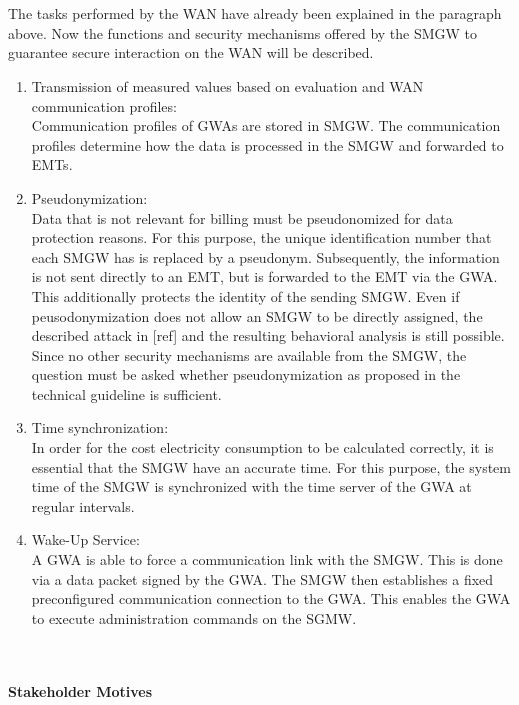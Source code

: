 \\
\\
The tasks performed by the WAN have already been explained in the paragraph above. Now the functions and security mechanisms offered by the SMGW to guarantee secure interaction on the WAN will be described.
\begin{enumerate}
\item Transmission of measured values based on evaluation and WAN communication profiles:\\
Communication profiles of GWAs are stored in SMGW. The communication profiles determine how the data is processed in the SMGW and forwarded to EMTs.

\item Pseudonymization:\\
Data that is not relevant for billing must be pseudonomized for data protection reasons. For this purpose, the unique identification number that each SMGW has is replaced by a pseudonym. Subsequently, the information is not sent directly to an EMT, but is forwarded to the EMT via the GWA. This additionally protects the identity of the sending SMGW.%
Even if peusodonymization does not allow an SMGW to be directly assigned, the described attack in [ref] and the resulting behavioral analysis is still possible. Since no other security mechanisms are available from the SMGW, the question must be asked whether pseudonymization as proposed in the technical guideline is sufficient.

\item Time synchronization:\\
In order for the cost electricity consumption to be calculated correctly, it is essential that the SMGW have an accurate time. For this purpose, the system time of the SMGW is synchronized with the time server of the GWA at regular intervals.

\item Wake-Up Service:\\
A GWA is able to force a communication link with the SMGW. This is done via a data packet signed by the GWA. The SMGW then establishes a fixed preconfigured communication connection to the GWA. This enables the GWA to execute administration commands on the SGMW. 
\end{enumerate}
\\
\\
\textbf{Stakeholder Motives}
\\
\\
